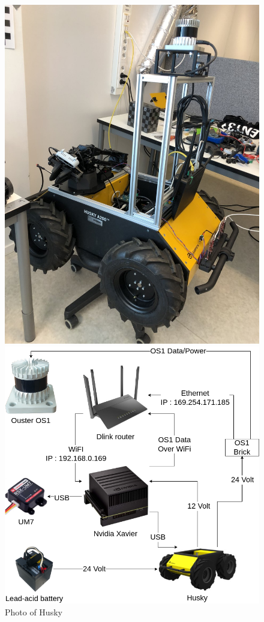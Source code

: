 \begin{figure}[H]
  \centering
  \begin{minipage}[b]{0.4\textwidth}
    \includegraphics[width=\textwidth]{Figures/images/husky_irl.jpg}
    \caption{Photo of Husky}
    \label{fig:husky_irl}
  \end{minipage}
  \hfill
  \begin{minipage}[b]{0.59\textwidth}
    \includegraphics[width=\textwidth]{Figures/drawio/Husky_HW.drawio.png}

\end{minipage}
\end{figure}
